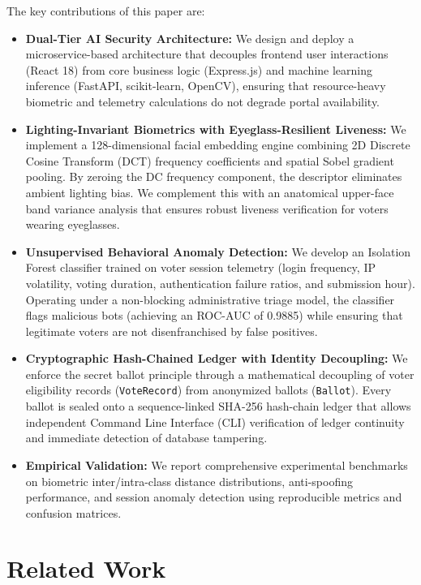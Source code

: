 \documentclass[conference]{IEEEtran}
\begin{document}
The key contributions of this paper are:
\begin{itemize}
    \item \textbf{Dual-Tier AI Security Architecture:} We design and deploy a microservice-based architecture that decouples frontend user interactions (React 18) from core business logic (Express.js) and machine learning inference (FastAPI, scikit-learn, OpenCV), ensuring that resource-heavy biometric and telemetry calculations do not degrade portal availability.
    \item \textbf{Lighting-Invariant Biometrics with Eyeglass-Resilient Liveness:} We implement a 128-dimensional facial embedding engine combining 2D Discrete Cosine Transform (DCT) frequency coefficients and spatial Sobel gradient pooling. By zeroing the DC frequency component, the descriptor eliminates ambient lighting bias. We complement this with an anatomical upper-face band variance analysis that ensures robust liveness verification for voters wearing eyeglasses.
    \item \textbf{Unsupervised Behavioral Anomaly Detection:} We develop an Isolation Forest classifier trained on voter session telemetry (login frequency, IP volatility, voting duration, authentication failure ratios, and submission hour). Operating under a non-blocking administrative triage model, the classifier flags malicious bots (achieving an ROC-AUC of 0.9885) while ensuring that legitimate voters are not disenfranchised by false positives.
    \item \textbf{Cryptographic Hash-Chained Ledger with Identity Decoupling:} We enforce the secret ballot principle through a mathematical decoupling of voter eligibility records (\texttt{VoteRecord}) from anonymized ballots (\texttt{Ballot}). Every ballot is sealed onto a sequence-linked SHA-256 hash-chain ledger that allows independent Command Line Interface (CLI) verification of ledger continuity and immediate detection of database tampering.
    \item \textbf{Empirical Validation:} We report comprehensive experimental benchmarks on biometric inter/intra-class distance distributions, anti-spoofing performance, and session anomaly detection using reproducible metrics and confusion matrices.
\end{itemize}

\section{Related Work}
\end{document}
